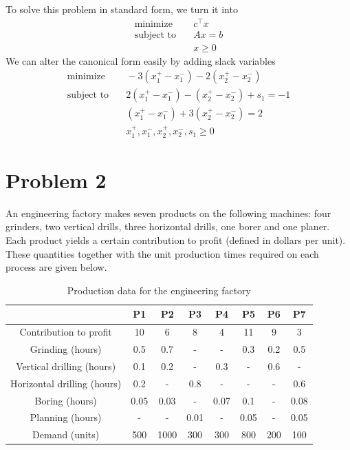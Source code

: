 \documentclass[11pt]{article}
\begin{document}
To solve this problem in standard form, we turn it into
\begin{align*}
  \text{minimize} & \quad c^\top x \\
  \text{subject to} & \quad Ax = b \\
  & \quad x \geq 0
\end{align*}
We can alter the canonical form easily by adding slack variables
\begin{align*}
  \text{minimize} & \quad -3 (x_1^+ - x_1^-) - 2(x_2^+ - x_2^-) \\
  \text{subject to} & \quad 2(x_1^+ - x_1^-) - (x_2^+ - x_2^-) + s_1 = -1 \\
  & \quad (x_1^+ - x_1^-) + 3(x_2^+ - x_2^-) = 2 \\
  & \quad x_1^+, x_1^-, x_2^+, x_2^-, s_1 \geq 0
\end{align*}

\section{Problem 2}
An engineering factory makes seven products on the following machines: four
grinders, two vertical drills, three horizontal drills, one borer and one planer. Each product
yields a certain contribution to profit (defined in dollars per unit). These quantities together
with the unit production times required on each process are given below.

\begin{table}[h!]
\centering
\begin{tabular}{|c|c|c|c|c|c|c|c|}
\hline
 & P1 & P2 & P3 & P4 & P5 & P6 & P7 \\
\hline
Contribution to profit & 10 & 6 & 8 & 4 & 11 & 9 & 3 \\
\hline
Grinding (hours) & 0.5 & 0.7 & - & - & 0.3 & 0.2 & 0.5 \\
\hline
Vertical drilling (hours) & 0.1 & 0.2 & - & 0.3 & - & 0.6 & - \\
\hline
Horizontal drilling (hours) & 0.2 & - & 0.8 & - & - & - & 0.6 \\
\hline
Boring (hours) & 0.05 & 0.03 & - & 0.07 & 0.1 & - & 0.08 \\
\hline
Planning (hours) & - & - & 0.01 & - & 0.05 & - & 0.05 \\
\hline
Demand (units) & 500 & 1000 & 300 & 300 & 800 & 200 & 100 \\
\hline
\end{tabular}
\caption{Production data for the engineering factory}
\label{tab_problem2}
\end{table}
\end{document}
